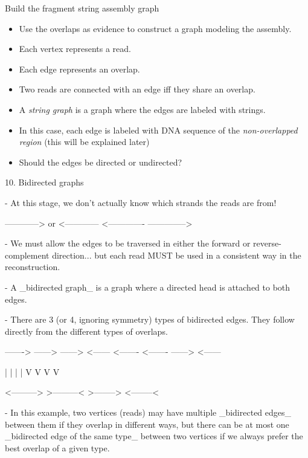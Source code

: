 \documentclass[xcolor=dvipsnames]{beamer}
\begin{document}
\begin{frame}{Build the fragment string assembly graph}
	\begin{itemize}
		
		\item Use the overlaps as evidence to construct a graph modeling the assembly.
		\item Each vertex represents a read.
		\item Each edge represents an overlap.
		\item Two reads are connected with an edge iff they share an overlap.
		\item A {\it string graph} is a graph where the edges are labeled with
		strings.
		\item In this case, each edge is labeled with DNA sequence of the {\em
		non-overlapped region} (this will be explained later)
		\item Should the edges be directed or undirected?
	\end{itemize}
\end{frame}


10. Bidirected graphs

- At this stage, we don't actually know which strands the reads are from!

------------>            or             <------------
     <-------------             -------------->

- We must allow the edges to be traversed in either the forward or
  reverse-complement direction... but each read MUST be used in a consistent way
  in the reconstruction.

- A _bidirected graph_ is a graph where a directed head is attached to both
  edges.

- There are 3 (or 4, ignoring symmetry) types of bidirected edges.  They follow
  directly from the different types of overlaps.

     ------->   ------>      ------>     <------
  <-------         <-------     ------>     <------

      |               |           |          |
      V               V           V          V  

  <--------->   >---------<  >-------->  <--------<

- In this example, two vertices (reads) may have multiple _bidirected edges_
  between them if they overlap in different ways, but there can be at most one
  _bidirected edge of the same type_ between two vertices if we always prefer
  the best overlap of a given type.
\end{document}
